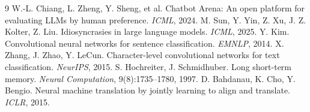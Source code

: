 \documentclass[11pt]{article}
\begin{document}
\begin{thebibliography}{9}\small
{} W.-L. Chiang, L. Zheng, Y. Sheng, et al. Chatbot Arena: An open platform for evaluating LLMs by human preference. \textit{ICML}, 2024.
 M. Sun, Y. Yin, Z. Xu, J. Z. Kolter, Z. Liu. Idiosyncrasies in large language models. \textit{ICML}, 2025.
 Y. Kim. Convolutional neural networks for sentence classification. \textit{EMNLP}, 2014.
 X. Zhang, J. Zhao, Y. LeCun. Character-level convolutional networks for text classification. \textit{NeurIPS}, 2015.
 S. Hochreiter, J. Schmidhuber. Long short-term memory. \textit{Neural Computation}, 9(8):1735--1780, 1997.
 D. Bahdanau, K. Cho, Y. Bengio. Neural machine translation by jointly learning to align and translate. \textit{ICLR}, 2015.
\end{thebibliography}
\end{document}
